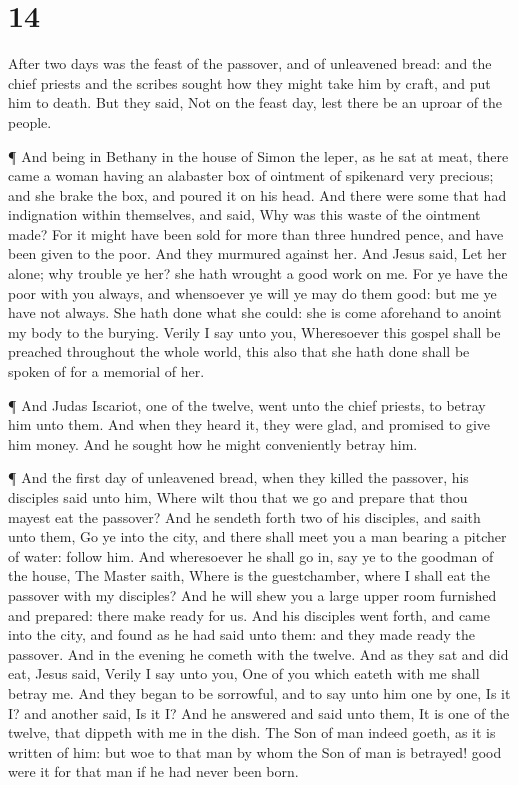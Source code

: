 \hypertarget{section-13}{%
\section{14}\label{section-13}}

 After two days was the feast of the passover, and of
unleavened bread: and the chief priests and the scribes sought how they
might take him by craft, and put him to death.  But they
said, Not on the feast day, lest there be an uproar of the people.

 ¶ And being in Bethany in the house of Simon the leper, as
he sat at meat, there came a woman having an alabaster box of ointment
of spikenard very precious; and she brake the box, and poured it on his
head.  And there were some that had indignation within
themselves, and said, Why was this waste of the ointment made?
 For it might have been sold for more than three hundred
pence, and have been given to the poor. And they murmured against her.
 And Jesus said, Let her alone; why trouble ye her? she hath
wrought a good work on me.  For ye have the poor with you
always, and whensoever ye will ye may do them good: but me ye have not
always.  She hath done what she could: she is come aforehand
to anoint my body to the burying.  Verily I say unto you,
Wheresoever this gospel shall be preached throughout the whole world,
this also that she hath done shall be spoken of for a memorial of her.

 ¶ And Judas Iscariot, one of the twelve, went unto the
chief priests, to betray him unto them.  And when they
heard it, they were glad, and promised to give him money. And he sought
how he might conveniently betray him.

 ¶ And the first day of unleavened bread, when they killed
the passover, his disciples said unto him, Where wilt thou that we go
and prepare that thou mayest eat the passover?  And he
sendeth forth two of his disciples, and saith unto them, Go ye into the
city, and there shall meet you a man bearing a pitcher of water: follow
him.  And wheresoever he shall go in, say ye to the goodman
of the house, The Master saith, Where is the guestchamber, where I shall
eat the passover with my disciples?  And he will shew you a
large upper room furnished and prepared: there make ready for us.
 And his disciples went forth, and came into the city, and
found as he had said unto them: and they made ready the passover.
 And in the evening he cometh with the twelve.
 And as they sat and did eat, Jesus said, Verily I say unto
you, One of you which eateth with me shall betray me.  And
they began to be sorrowful, and to say unto him one by one, Is it I? and
another said, Is it I?  And he answered and said unto them,
It is one of the twelve, that dippeth with me in the dish. 
The Son of man indeed goeth, as it is written of him: but woe to that
man by whom the Son of man is betrayed! good were it for that man if he
had never been born.

